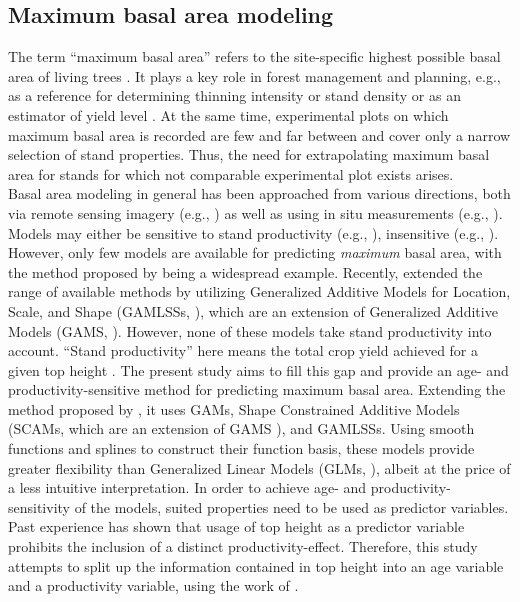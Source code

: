 \subsection{Maximum basal area modeling}

The term ``maximum basal area'' refers to the site-specific highest possible basal area of living trees \parencite{Assmann1970}.  It plays a key role in forest management and planning, e.g., as a reference for determining thinning intensity \parencite{Assmann1961,Doebbeler2002} or stand density \parencite{Spellmann1999} or as an estimator of yield level \parencite{Franz1967}.  At the same time, experimental plots on which maximum basal area is recorded are few and far between and cover only a narrow selection of stand properties.  Thus, the need for extrapolating maximum basal area for stands for which not comparable experimental plot exists arises.  \\
Basal area modeling in general has been approached from various directions, both via remote sensing imagery (e.g., \textcite{Silva2017}) as well as using in situ measurements (e.g., \textcite{Yue2012}).  Models may either be sensitive to stand productivity (e.g., \textcite{Castedo-Dorado2007}), insensitive (e.g., \textcite{Monserud1996}).  However, only few models are available for predicting \emph{maximum} basal area, with the method proposed by \textcite{Sterba1975} being a widespread example.  Recently, \textcite{Woerdehoff2014,Woerdehoff2016} extended the range of available methods by utilizing Generalized Additive Models for Location, Scale, and Shape (GAMLSSs, \textcite{Rigby2001}), which are an extension of Generalized Additive Models (GAMS, \textcite{Hastie1991}).  However, none of these models take stand productivity into account.  ``Stand productivity'' here means the total crop yield achieved for a given top height \parencite{Assmann1970}.  The present study aims to fill this gap and provide an age- and productivity-sensitive method for predicting maximum basal area.  Extending the method proposed by \textcite{Woerdehoff2016}, it uses GAMs, Shape Constrained Additive Models (SCAMs, which are an extension of GAMS \parencite{Pya2010}), and GAMLSSs.  Using smooth functions and splines to construct their function basis, these models provide greater flexibility than Generalized Linear Models (GLMs, \textcite{Nelder1972}), albeit at the price of a less intuitive interpretation.  In order to achieve age- and productivity-sensitivity of the models, suited properties need to be used as predictor variables.  Past experience has shown that usage of top height as a predictor variable prohibits the inclusion of a distinct productivity-effect.  Therefore, this study attempts to split up the information contained in top height into an age variable and a productivity variable, using the work of \textcite{Nagel1999}.

